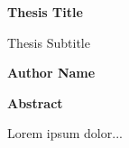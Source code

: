 \documentclass[a4paper,12pt]{report}
\begin{document}
\thispagestyle{plain}
\begin{center}
    \Large
    \textbf{Thesis Title}
        
    \vspace{0.4cm}
    \large
    Thesis Subtitle
        
    \vspace{0.4cm}
    \textbf{Author Name}
       
    \vspace{0.9cm}
    \textbf{Abstract}
\end{center}
Lorem ipsum dolor...
\end{document}
